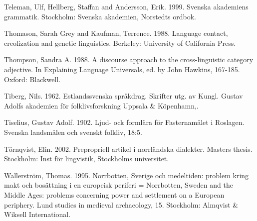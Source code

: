 \begin{styleBodytextC}
Teleman, Ulf, Hellberg, Staffan and Andersson, Erik. 1999. Svenska akademiens grammatik. Stockholm: Svenska akademien, Norstedts ordbok.

\end{styleBodytextC}

\begin{styleBodytextC}
Thomason, Sarah Grey and Kaufman, Terrence. 1988. Language contact, creolization and genetic linguistics. Berkeley: University of California Press.

\end{styleBodytextC}

\begin{styleBodytextC}
Thompson, Sandra A. 1988. A discourse approach to the cross-linguistic category {\textquotedbl}adjective{\textquotedbl}. In Explaining Language Universals, ed. by John Hawkins, 167-185. Oxford: Blackwell.

\end{styleBodytextC}

\begin{styleBodytextC}
Tiberg, Nils. 1962. Estlandssvenska språkdrag. Skrifter utg. av Kungl. Gustav Adolfs akademien för folklivsforskning Uppsala \& Köpenhamn,.

\end{styleBodytextC}

\begin{styleBodytextC}
Tiselius, Gustav Adolf. 1902. Ljud- ock formlära för Fasternamålet i Roslagen. Svenska landsmålen och svenskt folkliv, 18:5.

\end{styleBodytextC}

\begin{styleBodytextC}
Törnqvist, Elin. 2002. Prepropriell artikel i norrländska dialekter. Masters thesis. Stockholm: Inst för lingvistik, Stockholms universitet.

\end{styleBodytextC}

\begin{styleBodytextC}
Wallerström, Thomas. 1995. Norrbotten, Sverige och medeltiden: problem kring makt och bosättning i en europeisk periferi = Norrbotten, Sweden and the Middle Ages: problems concerning power and settlement on a European periphery. Lund studies in medieval archaeology, 15. Stockholm: Almqvist \& Wiksell International.

\end{styleBodytextC}

